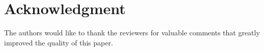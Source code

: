 \documentclass[journal, twoside]{IEEEtran}
\begin{document}
%



\section*{Acknowledgment}
The authors would like to thank the reviewers for valuable
comments that greatly improved the quality of this paper.


\ifCLASSOPTIONcaptionsoff
  \newpage
\fi




\end{document}
